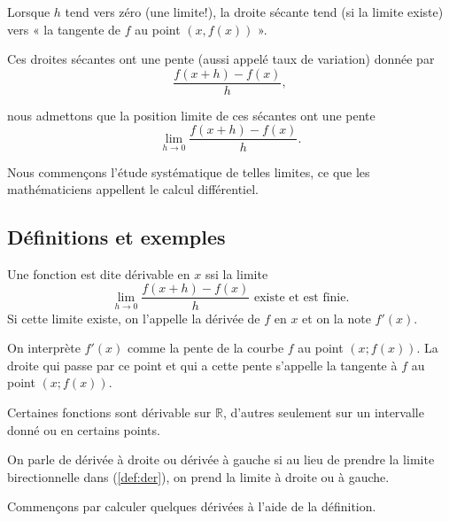 \documentclass[a4paper,12pt]{article}
\begin{document}
\vspace{0.5cm}

Lorsque $h$ tend vers zéro (une limite!), la droite sécante tend (si la limite existe) vers « la tangente de $f$ au point $(x, f(x))$ ».

Ces droites sécantes ont une pente (aussi appelé taux de variation) donnée par
\begin{equation}
\frac{f(x + h) - f(x)}{h},
\end{equation}

nous admettons que la position limite de ces sécantes ont une pente 
\begin{equation}
\lim_{h \to 0} \frac{f(x + h) - f(x)}{h}.
\end{equation}

Nous commençons l'étude systématique de telles limites, ce que les mathématiciens appellent le calcul différentiel.

\begin{center}
\end{center}
\subsection{Définitions et exemples}
\begin{definition}
	\tcblower
	Une fonction est dite dérivable en $x$ ssi la limite
	\begin{equation}
		\lim_{h\to0}\dfrac{ f(x+h)-f(x)}{h} \text{ existe et est finie.}
		\label{def:der}
		\tag{$\star$}
	\end{equation}
	Si cette limite existe, on l'appelle la dérivée de $f$ en $x$ et on la note $f'(x)$.  
\end{definition}
\begin{definition}
	\tcblower
On interprète $f'(x)$ comme la pente de la courbe $f$ au point $(x;f(x))$. La droite qui passe par ce point et qui a cette pente s'appelle la tangente à $f$ au point $(x;f(x))$. 
\end{definition}
\begin{remarque}
	\tcblower
	Certaines fonctions sont dérivable sur $\mathbb{R}$, d'autres seulement sur un intervalle donné ou en certains points.
\end{remarque}
\begin{remarque}[label=rem:derdg]
	\tcblower 
On parle de dérivée à droite ou dérivée à gauche si au lieu de prendre la limite birectionnelle dans (\ref{def:der}), on prend la limite à droite ou à gauche.
\end{remarque}
\begin{autre}
	\tcblower
	Commençons par calculer quelques dérivées à l'aide de la définition.
\end{autre}
\end{document}
